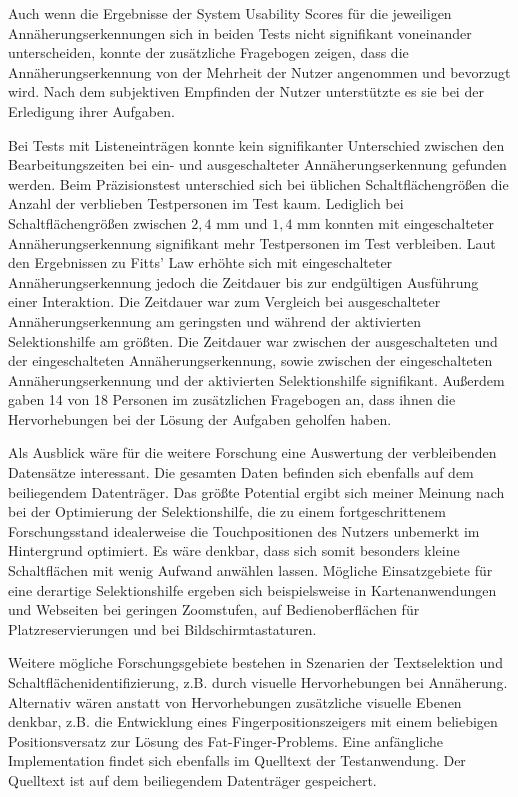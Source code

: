 \documentclass[12pt,numbers=noenddot,parskip,bibliography=totocnumbered,listof=totocnumbered]{scrreprt}
\begin{document}
Auch wenn die Ergebnisse der System Usability Scores für die jeweiligen Annäherungserkennungen sich in beiden Tests nicht signifikant voneinander unterscheiden, konnte der zusätzliche Fragebogen zeigen, dass die Annäherungserkennung von der Mehrheit der Nutzer angenommen und bevorzugt wird. Nach dem subjektiven Empfinden der Nutzer unterstützte es sie bei der Erledigung ihrer Aufgaben.

Bei Tests mit Listeneinträgen konnte kein signifikanter Unterschied zwischen den Bearbeitungszeiten bei ein- und ausgeschalteter Annäherungserkennung gefunden werden. Beim Präzisionstest unterschied sich bei üblichen Schaltflächengrößen die Anzahl der verblieben Testpersonen im Test kaum. Lediglich bei Schaltflächengrößen zwischen $2{,}4$ mm und $1{,}4$ mm konnten mit eingeschalteter Annäherungserkennung signifikant mehr Testpersonen im Test verbleiben. Laut den Ergebnissen zu Fitts' Law erhöhte sich mit eingeschalteter Annäherungserkennung jedoch die Zeitdauer bis zur endgültigen Ausführung einer Interaktion. Die Zeitdauer war zum Vergleich bei ausgeschalteter Annäherungserkennung am geringsten und während der aktivierten Selektionshilfe am größten. Die Zeitdauer war zwischen der ausgeschalteten und der eingeschalteten Annäherungserkennung, sowie zwischen der eingeschalteten Annäherungserkennung und der aktivierten Selektionshilfe signifikant. Außerdem gaben 14 von 18 Personen im zusätzlichen Fragebogen an, dass ihnen die Hervorhebungen bei der Lösung der Aufgaben geholfen haben.

Als Ausblick wäre für die weitere Forschung eine Auswertung der verbleibenden Datensätze interessant. Die gesamten Daten befinden sich ebenfalls auf dem beiliegendem Datenträger. Das größte Potential ergibt sich meiner Meinung nach bei der Optimierung der Selektionshilfe, die zu einem fortgeschrittenem Forschungsstand idealerweise die Touchpositionen des Nutzers unbemerkt im Hintergrund optimiert. Es wäre denkbar, dass sich somit besonders kleine Schaltflächen mit wenig Aufwand anwählen lassen. Mögliche Einsatzgebiete für eine derartige Selektionshilfe ergeben sich beispielsweise in Kartenanwendungen und Webseiten bei geringen Zoomstufen, auf Bedienoberflächen für Platzreservierungen und bei Bildschirmtastaturen.

Weitere mögliche Forschungsgebiete bestehen in Szenarien der Textselektion und Schaltflächenidentifizierung, z.B. durch visuelle Hervorhebungen bei Annäherung.\\
Alternativ wären anstatt von Hervorhebungen zusätzliche visuelle Ebenen denkbar, z.B. die Entwicklung eines Fingerpositionszeigers mit einem beliebigen Positionsversatz zur Lösung des Fat-Finger-Problems. Eine anfängliche Implementation findet sich ebenfalls im Quelltext der Testanwendung. Der Quelltext ist auf dem beiliegendem Datenträger gespeichert.
\end{document}
